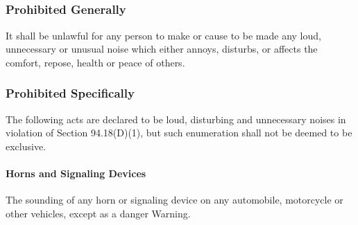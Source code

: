 \subsection{}
\subsubsection{Prohibited Generally}
It shall be unlawful for any person to make or cause to be made any loud, unnecessary or unusual noise which either annoys, disturbs, or affects the comfort, repose, health or peace of others.
\subsubsection{Prohibited Specifically}
The following acts are declared to be loud, disturbing and unnecessary noises in violation of Section 94.18(D)(1), but such enumeration shall not be deemed to be exclusive.
\paragraph{Horns and Signaling Devices}
The sounding of any horn or signaling device on any automobile, motorcycle or other vehicles, except as a danger Warning.
